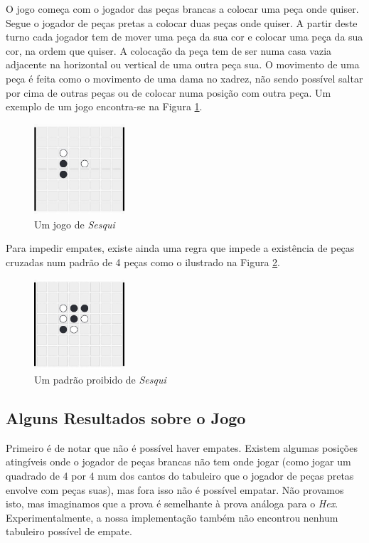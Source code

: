 \documentclass[12pt,a4paper,oneside]{article}
\begin{document}
O jogo começa com o jogador das peças brancas a colocar uma peça onde
quiser. Segue o jogador de peças pretas a colocar duas peças onde
quiser. A partir deste turno cada jogador tem de mover uma peça da sua
cor e colocar uma peça da sua cor, na ordem que quiser. A colocação da
peça tem de ser numa casa vazia adjacente na horizontal ou vertical de
uma outra peça sua. O movimento de uma peça é feita como o movimento
de uma dama no xadrez, não sendo possível saltar por cima de outras
peças ou de colocar numa posição com outra peça. Um exemplo de um jogo
encontra-se na Figura \ref{fig:sesqui}.

\begin{figure}[!htb]
  \centering
  \includegraphics[width=0.3\textwidth]{sesqui_game}
  \caption{Um jogo de \textit{Sesqui}}
  \label{fig:sesqui}
\end{figure}

Para impedir empates, existe ainda uma regra que impede a existência
de peças cruzadas num padrão de 4 peças como o ilustrado na Figura
\ref{fig:cross}.

\begin{figure}[!htb]
  \centering
  \includegraphics[width=0.3\textwidth]{sesqui_forb}
  \caption{Um padrão proibido de \textit{Sesqui}}
  \label{fig:cross}
\end{figure}

\subsection{Alguns Resultados sobre o Jogo}


Primeiro é de notar que não é possível haver empates. Existem algumas
posições atingíveis onde o jogador de peças brancas não tem onde jogar
(como jogar um quadrado de 4 por 4 num dos cantos do tabuleiro que o
jogador de peças pretas envolve com peças suas), mas fora isso não é
possível empatar. Não provamos isto, mas imaginamos que a prova é
semelhante à prova análoga para o \textit{Hex}. Experimentalmente, a
nossa implementação também não encontrou nenhum tabuleiro possível de
empate.
\end{document}
